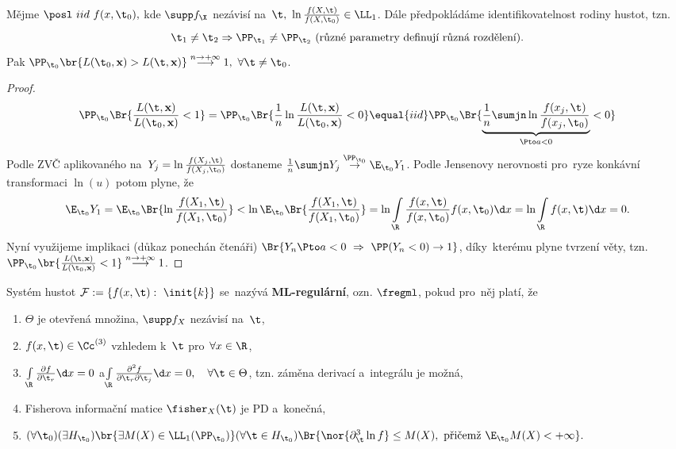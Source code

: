 \begin{theorem}\label{vetaspravdepodobnosti}
	Mějme $\posl~iid~f(x,\t_0),$ kde $\supp f_\X$ nezávisí na~$\t,~\ln\frac{f(X,\t)}{f(X,\t_0)}\in\LL_1$. Dále předpokládáme identifikovatelnost rodiny hustot, tzn. $$\t_1\neq\t_2\Rightarrow \PP_{\t_1}\neq \PP_{\t_2}\text{ (různé parametry definují různá rozdělení).}$$ Pak $\PP_{\t_0}\br{L(\t_0,\textbf{x})>L(\t,\textbf{x})}\stackrel{n\to+\infty}{\longrightarrow}1,~\forall\t\neq\t_0$.
	\begin{proof}

		$$ \PP_{\t_0}\Br{\frac{L(\t,\textbf{x})}{L(\t_0,\textbf{x})}<1}=\PP_{\t_0}\Br{\frac{1}{n}\ln\frac{L(\t,\textbf{x})}{L(\t_0,\textbf{x})}<0}\equal{iid}\PP_{\t_0}\Br{\underbrace{\frac{1}{n}\sumjn\ln\frac{f(x_j,\t)}{f(x_j,\t_0)}}_{\Pto a<0}<0} $$
		Podle ZVČ aplikovaného na~$Y_j=\ln\frac{f(X_j,\t)}{f(X_j,\t_0)}$ dostaneme $\frac{1}{n}\sumjn Y_j\stackrel{\PP_{\t_0}}{\to}\E_{\t_0} Y_1$. Podle Jensenovy nerovnosti pro~ryze konkávní transformaci $\ln(u)$ potom plyne, že 
		$$\E_{\t_0} Y_1=\E_{\t_0}\Br{\ln\frac{f(X_1,\t)}{f(X_1,\t_0)}}< \ln\E_{\t_0}\Br{\frac{f(X_1,\t)}{f(X_1,\t_0)}}=\ln\int\limits_{\R} \frac{f(x,\t)}{f(x,\t_0)}f(x,\t_0)\d x= \ln\int\limits_{\R} f(x,\t)\d x=0. $$
		Nyní využijeme implikaci (důkaz ponechán čtenáři) $\Br{Y_n\Pto a<0~\Rightarrow~\PP(Y_n<0)\to1}$, díky~kterému plyne tvrzení věty, tzn.  $\PP_{\t_0}\br{\frac{L(\t,\textbf{x})}{L(\t_0,\textbf{x})}<1}\stackrel{n\to+\infty}{\longrightarrow}1$.
	\end{proof}
\end{theorem}
\begin{define}
	Systém hustot $\mathcal{F}:=\{ f(x,\t):~\init{k} \}$ se~nazývá \textbf{ML-regulární}, ozn. $\fregml$, pokud pro~něj platí, že \begin{enumerate}
		\item $\Theta$ je otevřená množina, $\supp f_X$ nezávisí na~$\t$,
		\item $f(x,\t)\in\Cc^{(3)}$ vzhledem k~$\t$ pro~$\forall x\in\R$,
		\item $\int\limits_{\R} \frac{\partial f}{\partial\t_r}\d x=0$ \quad a\quad  $\int\limits_{\R} \frac{\partial^2 f}{\partial\t_r\partial\t_j}\d x=0,\quad \forall\t\in\Theta$, tzn. záměna derivací a~integrálu je možná,
		\item  Fisherova informační matice $\fisher_X(\t)$ je PD a~konečná,
		\item \mbox{$(\forall\t_0)(\exists H_{\t_0})\br{\exists M(X)\in\LL_1(\PP_{\t_0})}(\forall\t\in H_{\t_0})\Br{\nor{\partial_\t^3\ln f}\leq M(X),~\text{přičemž }\E_{\t_0} M(X)<+\infty}.$}
	\end{enumerate}
\end{define}
